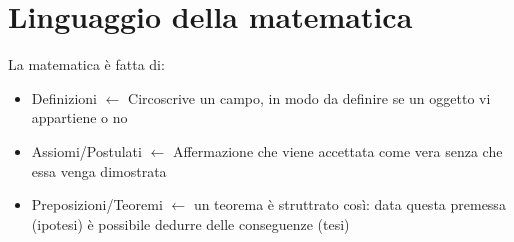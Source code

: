 \documentclass[12pt, a4paper, openany]{book}
\begin{document}

\section{Linguaggio della matematica }
La matematica è fatta di:
\begin{itemize}
    \item Definizioni $\leftarrow$ Circoscrive un campo, in modo da definire se un oggetto vi appartiene o no
    \item Assiomi/Postulati $\leftarrow$  Affermazione che viene accettata come vera senza che essa venga dimostrata
    \item Preposizioni/Teoremi $\leftarrow$  un teorema è struttrato così: data questa premessa (ipotesi) è possibile dedurre delle conseguenze (tesi)
\end{itemize}
\end{document}
